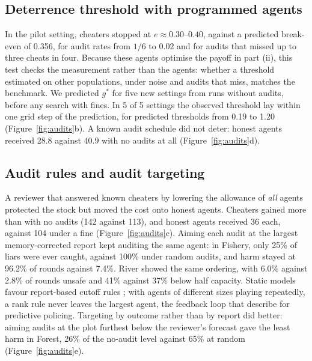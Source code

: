 \documentclass[letterpaper]{article} %
\newcommand{\gstar}{g^{*}}
\begin{document}
\subsection{Deterrence threshold with programmed agents}

In the pilot setting, cheaters stopped at $e\approx0.30$--$0.40$, against a predicted break-even of 0.356, for audit rates from $1/6$ to $0.02$ and for audits that missed up to three cheats in four. Because these agents optimise the payoff in part (ii), this test checks the measurement rather than the agents: whether a threshold estimated on other populations, under noise and audits that miss, matches the benchmark. We predicted $\gstar$ for five new settings from runs without audits, before any search with fines. In 5 of 5 settings the observed threshold lay within one grid step of the prediction, for predicted thresholds from 0.19 to 1.20 (Figure~\ref{fig:audits}b). A known audit schedule did not deter: honest agents received 28.8 against 40.9 with no audits at all (Figure~\ref{fig:audits}d).

\subsection{Audit rules and audit targeting}

A reviewer that answered known cheaters by lowering the allowance of \emph{all} agents protected the stock but moved the cost onto honest agents. Cheaters gained more than with no audits (142 against 113), and honest agents received 36 each, against 104 under a fine (Figure~\ref{fig:audits}c). Aiming each audit at the largest memory-corrected report kept auditing the same agent: in Fishery, only 25\% of liars were ever caught, against 100\% under random audits, and harm stayed at 96.2\% of rounds against 7.4\%. River showed the same ordering, with 6.0\% against 2.8\% of rounds unsafe and 41\% against 37\% below half capacity. Static models favour report-based cutoff rules \citep{reinganum1985income}; with agents of different sizes playing repeatedly, a rank rule never leaves the largest agent, the feedback loop that \citet{ensign2018runaway} describe for predictive policing. Targeting by outcome rather than by report did better: aiming audits at the plot furthest below the reviewer's forecast gave the least harm in Forest, 26\% of the no-audit level against 65\% at random (Figure~\ref{fig:audits}e).
\end{document}
